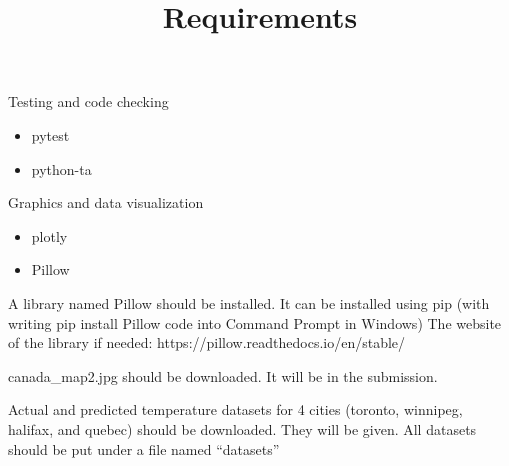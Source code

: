 \documentclass{article}
\title{Requirements}
\begin{document}
Testing and code checking
\begin{itemize}

  \item pytest

  \item python-ta
 \end{itemize}

Graphics and data visualization
\begin{itemize}
  \item plotly

  \item Pillow
   
\end{itemize}

A library named Pillow should be installed. It can be installed using pip (with writing pip install Pillow code into Command Prompt in Windows) The website of the library if needed: https://pillow.readthedocs.io/en/stable/ 

canada\_map2.jpg should be downloaded. It will be in the submission.

Actual and predicted temperature datasets for 4 cities (toronto, winnipeg, halifax, and quebec) should be downloaded. They will be given. All datasets should be put under a file named “datasets” 
\end{document}
